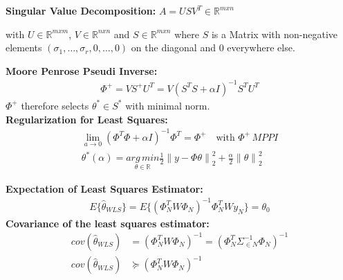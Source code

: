 \begin{tcolorbox}[colback=red!5!white,colframe=red!75!black,title=\textbf{Ill-Posed Least Squares}]	
\textbf{Singular Value Decomposition: } $A = USV^T \in\mathbb R^{mxn} $
\begin{addmargin}[1em]{0em}
	with $U\in\mathbb R^{mxm}$, $V\in\mathbb R^{nxn}$ and $S\in\mathbb R^{mxn}$ where $S$ is a Matrix with non-negative elements $(\sigma_1,\dots,\sigma_r, 0,\dots,0)$ on the diagonal and 0 everywhere else.
\end{addmargin}
\textbf{Moore Penrose Pseudi Inverse: }
\begin{align*}
	\Phi^+ = VS^+ U^T = V(S^T S+\alpha I)^{-1} S^T U^T
\end{align*}
\hspace{1em} $\Phi^+$ therefore selects $\theta^* \in S^*$ with minimal norm. \\
\textbf{Regularization for Least Squares:}
\begin{align*}
	\underset{a \rightarrow 0}{\lim} (\Phi^T \Phi + \alpha I)^{-1} \Phi^T = \Phi^+ \quad \text{with }\Phi^+ \, MPPI \\
	\theta^* (\alpha )= \underset{\theta \in \mathbb{R}}{arg\,min}  \frac {1}{2} {\rVert y-\Phi\theta \rVert}_{2}^{2} + \frac {\alpha}{2} {\lVert \theta \rVert}_{2}^{2}
\end{align*}
\end{tcolorbox}

\begin{tcolorbox}[colback=red!5!white,colframe=red!75!black,title=\textbf{Statistical Analysis of WLS}]
\textbf{Expectation of Least Squares Estimator: }
\begin{align*}
	E \{\hat \theta_{WLS} \} = E \{ {(\Phi_{N}^{T} W \Phi_N)}^{-1} \Phi_{N}^{T} W y_N \} = \theta_0
\end{align*}
\textbf{Covariance of the least squares estimator: }
\begin{align*}
	cov(\hat \theta_{WLS}) &= {(\Phi_{N}^{T} W \Phi_N)}^{-1} = {(\Phi_{N}^{T} \Sigma_{\in N }^{-1} \Phi_{N}) }^{-1} \\
	cov(\hat \theta_{WLS}) &\succeq {(\Phi_{N}^{T} W \Phi_{N})}^{-1}
\end{align*}
\end{tcolorbox}

